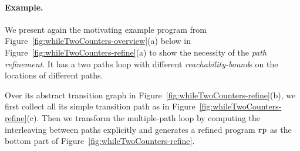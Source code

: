 
\paragraph{Example.}
 We present again the motivating example program from Figure~\ref{fig:whileTwoCounters-overview}(a)
 below in Figure~\ref{fig:whileTwoCounters-refine}(a)
to show the necessity of the \emph{path refinement}. 
It has a two paths loop
 with different \emph{reachability-bound}s on the locations of different paths.
 
 Over its abstract transition graph in Figure~\ref{fig:whileTwoCounters-refine}(b), we first collect all its simple transition path as in Figure~\ref{fig:whileTwoCounters-refine}(c).
 Then we transform the multiple-path loop by computing the interleaving between paths explicitly and
 generates a refined program $\mathtt{rp}$ as the bottom part of Figure~\ref{fig:whileTwoCounters-refine}.

